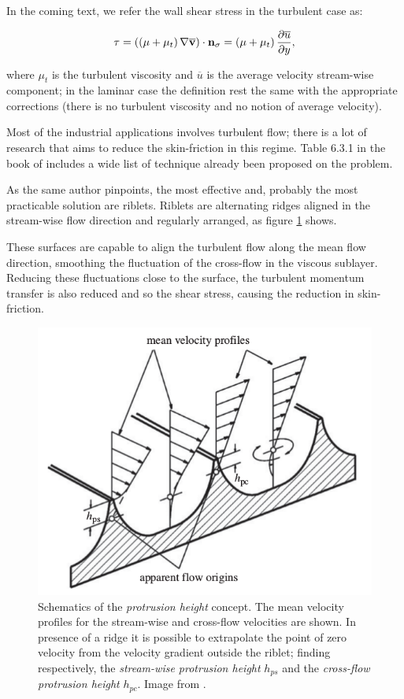 In the coming text, we refer the wall shear stress in the turbulent case as:

\begin{equation}
\tau = \left( \left( \mu + \mu_t \right)  \nabla \mathbf{\overline{v}} \right) \cdot  \mathbf{n}_{\sigma} = \left( \mu + \mu_t \right) \dfrac{\partial \overline{u}}{\partial y},
\end{equation}

where $\mu_t$ is the turbulent viscosity and $\overline{u}$ is the average velocity stream-wise component; in the laminar case the definition rest the same with the appropriate corrections (there is no turbulent viscosity and no notion of average velocity).

Most of the industrial applications involves turbulent flow; there is a lot of research that aims to reduce the skin-friction in this regime.
Table 6.3.1 in the book of \citet{mclean2012understanding} includes a wide list of technique already been proposed on the problem.

As the same author pinpoints, the most effective and, probably the most practicable solution are riblets.
Riblets are alternating ridges aligned in the stream-wise flow direction and regularly arranged, as figure \ref{fig:riblets1} shows.

These surfaces are capable to align the turbulent flow along the mean flow direction, smoothing the fluctuation of the cross-flow in the viscous sublayer.
Reducing these fluctuations close to the surface, the turbulent momentum transfer is also reduced and so the shear stress, causing the reduction in skin-friction.

\begin{figure}[h]
	\centering
	\includegraphics[width=0.7\linewidth]{chapter_1/riblets3}
	\caption{Schematics of the  \textit{protrusion height} concept. The mean velocity profiles for the stream-wise and cross-flow velocities are shown. In presence of a ridge it is possible to extrapolate the point of zero velocity from the velocity gradient outside the riblet; finding respectively, the \textit{stream-wise protrusion height} $h_{ps}$ and the \textit{cross-flow protrusion height} $h_{pc}$. Image from \citet{bechert1997experiments}.}
	\label{fig:riblets1}
\end{figure}


